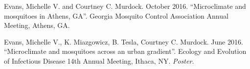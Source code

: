 \begin{cvitems}
	\item Evans, Michelle V. and Courtney C. Murdock. October 2016. ``Microclimate and mosquitoes in Athens, GA''. Georgia Mosquito Control Association Annual Meeting, Athens, GA.

	\item Evans, Michelle V., K. Miazgowicz, B. Tesla, Courtney C. Murdock. June 2016. ``Microclimate and mosquitoes across an urban gradient''. Ecology and Evolution of Infectious Disease 14th Annual Meeting, Ithaca, NY. \textit{Poster.}


	\bigskip
\end{cvitems}
